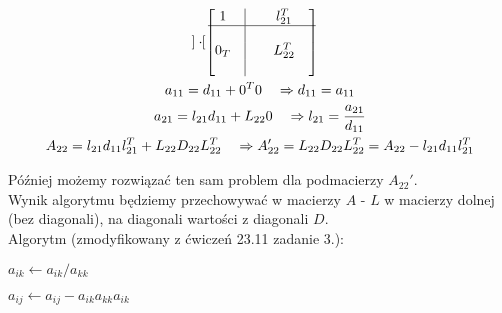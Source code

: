 \documentclass[a4paper]{article}
\begin{document}
\begin{enumerate}[label=(\alph*)]
\begin{gather*}
\begin{bmatrix}
                    \end{bmatrix}
                    \cdot
                    \begin{bmatrix}
                        1      & \vline & & l_{21}^{T} & \\
                        \hline
                               & \vline & &            & \\
                        0_{T}  & \vline & & L_{22}^{T} & \\
                               & \vline & &            & \\
                    \end{bmatrix} \\
                    a_{11} = d_{11} + 0^{T}0
                        \quad \Rightarrow d_{11} = a_{11} \\
                    a_{21} = l_{21}d_{11} + L_{22}0
                        \quad \Rightarrow l_{21} = \frac{a_{21}}{d_{11}} \\
                    A_{22} = l_{21}d_{11}l_{21}^{T} + L_{22}D_{22}L_{22}^{T}
                        \quad \Rightarrow A_{22}' = L_{22}D_{22}L_{22}^{T}
                        = A_{22} - l_{21}d_{11}l_{21}^{T}
                \end{gather*}

                Później możemy rozwiązać ten sam problem dla podmacierzy $A_{22}'$. \\

                Wynik algorytmu będziemy przechowywać w macierzy $A$ -
                $L$ w macierzy dolnej (bez diagonali),
                na diagonali wartości z diagonali $D$. \\

                Algorytm (zmodyfikowany z ćwiczeń 23.11 zadanie 3.):

                \begin{algorithm}
                    \begin{algorithmic}[1]

                                \State $a_{ik} \gets a_{ik} / a_{kk}$
                            \EndFor

                                    \State $a_{ij} \gets a_{ij} - a_{ik}a_{kk}a_{ik}$
                                \EndFor
                            \EndFor
                        \EndFor
                    \end{algorithmic}\label{alg:algorithm1}
                \end{algorithm}


\end{enumerate}
\end{document}
